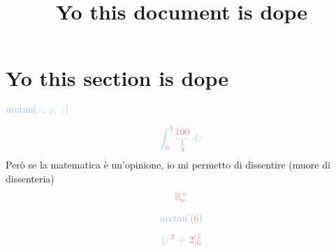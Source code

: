 \documentclass[letterpaper]{article}
\begin{document}
\title{Yo this document is dope}
\section{Yo this section is dope}

$ \fnVar{\arctan}{\hlVar{x} \hlTxt{,}\ \hlVar{y} \hlTxt{,} \ \hlVar{z}}{\hlLOne} $

\[
  \hlOprt{\int_{\hlLit{0}}^{\hlLit{1}}} \hlOprt{\frac{\hlLit{100}}{\frac{\hlLit{1}}{\hlLit{3}}}} \,\hlOprt{d}\hlVar{x}
\]
Però se la matematica è un'opinione, io mi permetto di dissentire (muore di dissenteria)
\[
  \setBasic{R^+_0}
\]

\[
  \fnDerVal{\arctan}{6}{\hlLTwo}
\]

\[
  \hlLOne{[} \var{x} \val{^2} \ \op{+} \ \val{2} \hlLOne{]} \val{_0^5}
\]
\end{document}
